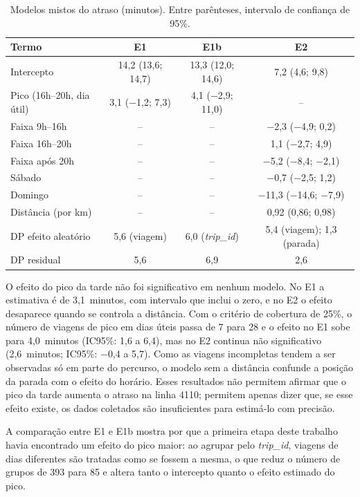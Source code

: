 \begin{table}[htbp]
\centering
\caption{Modelos mistos do atraso (minutos). Entre parênteses, intervalo de confiança de 95\%.}
\label{tab:atraso}
\small
\begin{tabular}{lccc}
\toprule
Termo & E1 & E1b & E2 \\
\midrule
Intercepto & 14,2 (13,6; 14,7) & 13,3 (12,0; 14,6) & 7,2 (4,6; 9,8) \\
Pico (16h--20h, dia útil) & 3,1 ($-$1,2; 7,3) & 4,1 ($-$2,9; 11,0) & -- \\
Faixa 9h--16h & -- & -- & $-$2,3 ($-$4,9; 0,2) \\
Faixa 16h--20h & -- & -- & 1,1 ($-$2,7; 4,9) \\
Faixa após 20h & -- & -- & $-$5,2 ($-$8,4; $-$2,1) \\
Sábado & -- & -- & $-$0,7 ($-$2,5; 1,2) \\
Domingo & -- & -- & $-$11,3 ($-$14,6; $-$7,9) \\
Distância (por km) & -- & -- & 0,92 (0,86; 0,98) \\
\midrule
DP efeito aleatório & 5,6 (viagem) & 6,0 (\textit{trip\_id}) & 5,4 (viagem); 1,3 (parada) \\
DP residual & 5,6 & 6,9 & 2,6 \\
\bottomrule
\end{tabular}
\end{table}

O efeito do pico da tarde não foi significativo em nenhum modelo. No E1 a estimativa é de
3,1~minutos, com intervalo que inclui o zero, e no E2 o efeito desaparece quando se controla a
distância. Com o critério de cobertura de 25\%, o número de viagens de pico em dias úteis
passa de 7 para 28 e o efeito no E1 sobe para 4,0~minutos (IC95\%: 1,6 a 6,4), mas no E2
continua não significativo (2,6~minutos; IC95\%: $-$0,4 a 5,7). Como as viagens incompletas
tendem a ser observadas só em parte do percurso, o modelo sem a distância confunde a posição
da parada com o efeito do horário. Esses resultados não permitem afirmar que o pico da tarde
aumenta o atraso na linha 4110; permitem apenas dizer que, se esse efeito existe, os dados
coletados são insuficientes para estimá-lo com precisão.

A comparação entre E1 e E1b mostra por que a primeira etapa deste trabalho havia encontrado
um efeito do pico maior: ao agrupar pelo \textit{trip\_id}, viagens de dias diferentes são
tratadas como se fossem a mesma, o que reduz o número de grupos de 393 para 85 e altera tanto
o intercepto quanto o efeito estimado do pico.

